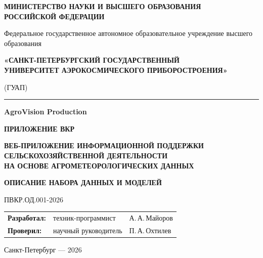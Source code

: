 \documentclass[14pt,a4paper]{extarticle}
\begin{document}
\begin{titlepage}
\thispagestyle{empty}
\begin{center}
  {\bfseries МИНИСТЕРСТВО НАУКИ И ВЫСШЕГО ОБРАЗОВАНИЯ\\
  РОССИЙСКОЙ ФЕДЕРАЦИИ}\vspace{4pt}

  {\small Федеральное государственное автономное образовательное
  учреждение высшего образования}

  \vspace{4pt}
  {\bfseries «САНКТ-ПЕТЕРБУРГСКИЙ ГОСУДАРСТВЕННЫЙ\\
  УНИВЕРСИТЕТ АЭРОКОСМИЧЕСКОГО ПРИБОРОСТРОЕНИЯ»}

  \vspace{4pt}(ГУАП)
\end{center}

\vspace{6pt}
\noindent\rule{\textwidth}{0.4pt}
\vspace{16pt}

\begin{center}
  {\bfseries AgroVision Production}

  \vspace{28pt}
  {\Large\bfseries ПРИЛОЖЕНИЕ ВКР}

  \vspace{10pt}
  {\bfseries ВЕБ-ПРИЛОЖЕНИЕ ИНФОРМАЦИОННОЙ ПОДДЕРЖКИ\\
  СЕЛЬСКОХОЗЯЙСТВЕННОЙ ДЕЯТЕЛЬНОСТИ\\
  НА ОСНОВЕ АГРОМЕТЕОРОЛОГИЧЕСКИХ ДАННЫХ}

  \vspace{20pt}
  {\Large\bfseries ОПИСАНИЕ НАБОРА ДАННЫХ И МОДЕЛЕЙ}

  \vspace{10pt}
  ПВКР.ОД.001-2026
\end{center}

\vspace{28pt}
\begin{tabular}{@{}lll@{}}
  \textbf{Разработал:} & техник-программист   & А.\,А.\,Майоров \\[6pt]
  \textbf{Проверил:}   & научный руководитель & П.\,А.\,Охтилев \\
\end{tabular}

\vfill
\begin{center}
  Санкт-Петербург — 2026
\end{center}
\end{titlepage}
\end{document}
